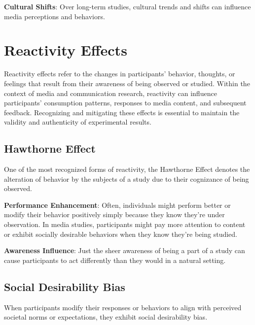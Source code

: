 \documentclass[
  b5paper]{book}
\begin{document}
\textbf{Cultural Shifts}: Over long-term studies, cultural trends and shifts can influence media perceptions and behaviors.

\hypertarget{reactivity-effects}{%
\section{Reactivity Effects}\label{reactivity-effects}}

Reactivity effects refer to the changes in participants' behavior, thoughts, or feelings that result from their awareness of being observed or studied. Within the context of media and communication research, reactivity can influence participants' consumption patterns, responses to media content, and subsequent feedback. Recognizing and mitigating these effects is essential to maintain the validity and authenticity of experimental results.

\hypertarget{hawthorne-effect}{%
\subsection*{Hawthorne Effect}\label{hawthorne-effect}}

One of the most recognized forms of reactivity, the Hawthorne Effect denotes the alteration of behavior by the subjects of a study due to their cognizance of being observed.

\textbf{Performance Enhancement}: Often, individuals might perform better or modify their behavior positively simply because they know they're under observation. In media studies, participants might pay more attention to content or exhibit socially desirable behaviors when they know they're being studied.

\textbf{Awareness Influence}: Just the sheer awareness of being a part of a study can cause participants to act differently than they would in a natural setting.

\hypertarget{social-desirability-bias}{%
\subsection*{Social Desirability Bias}\label{social-desirability-bias}}

When participants modify their responses or behaviors to align with perceived societal norms or expectations, they exhibit social desirability bias.
\end{document}

